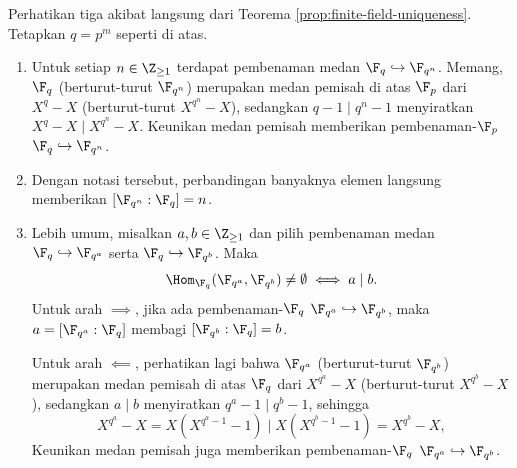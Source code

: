Perhatikan tiga akibat langsung dari Teorema \ref{prop:finite-field-uniqueness}. Tetapkan $q=p^m$ seperti di atas.
\begin{enumerate}
	\item Untuk setiap $n\in\Z_{\geq1}$ terdapat pembenaman medan $\F_q\hookrightarrow\F_{q^n}$. Memang, $\F_q$ (berturut-turut $\F_{q^n}$) merupakan medan pemisah di atas $\F_p$ dari $X^q-X$ (berturut-turut $X^{q^n}-X$), sedangkan $q-1\mid q^n-1$ menyiratkan $X^q-X\mid X^{q^n}-X$. Keunikan medan pemisah memberikan pembenaman-$\F_p$ $\F_q\hookrightarrow\F_{q^n}$.
	\item Dengan notasi tersebut, perbandingan banyaknya elemen langsung memberikan $[\F_{q^n}:\F_q]=n$.
	\item Lebih umum, misalkan $a,b\in\Z_{\geq1}$ dan pilih pembenaman medan $\F_q\hookrightarrow\F_{q^a}$ serta $\F_q\hookrightarrow\F_{q^b}$. Maka
	\[ \Hom_{\F_q}(\F_{q^a}, \F_{q^b}) \neq \emptyset \iff a \mid b. \]
	Untuk arah $\implies$, jika ada pembenaman-$\F_q$ $\F_{q^a}\hookrightarrow\F_{q^b}$, maka $a=[\F_{q^a}:\F_q]$ membagi $[\F_{q^b}:\F_q]=b$.

	Untuk arah $\impliedby$, perhatikan lagi bahwa $\F_{q^a}$ (berturut-turut $\F_{q^b}$) merupakan medan pemisah di atas $\F_q$ dari $X^{q^a}-X$ (berturut-turut $X^{q^b}-X$), sedangkan $a\mid b$ menyiratkan $q^a-1\mid q^b-1$, sehingga
	\[ X^{q^a} - X = X\left( X^{q^a - 1} - 1\right) \mid X\left( X^{q^b - 1} - 1\right) = X^{q^b} - X, \]
	Keunikan medan pemisah juga memberikan pembenaman-$\F_q$ $\F_{q^a} \hookrightarrow \F_{q^b}$.
\end{enumerate}

